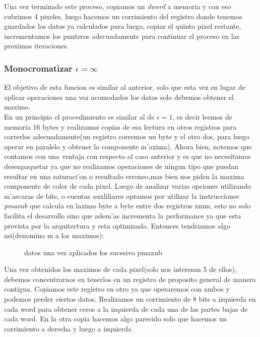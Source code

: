Una vez terminado este proceso, copiamos un \textit{dword} a memoria y con eso cubrimos 4 pixeles,
luego hacemos un corrimiento del registro donde tenemos guardados los datos ya calculados para luego,
copiar el quinto pixel restante, incrementamos los punteros adecuadamente para continuar el 
proceso en las proximas iteraciones.\\


\subsubsection{Monocromatizar $\epsilon = \infty $ }
El objetivo de esta funcion es similar al anterior, solo que esta vez en lugar de aplicar operaciones
una vez acomodados los datos solo debemos obtener el maximo.\\
En un principio el procedimiento es similar al de  $\epsilon= 1$, es decir leemos de memoria 16 bytes
y realizamos copias de esa lectura en otros registros para correrlos adecuadamente(un registro corremos un byte 
 y el otro dos, para luego operar en paralelo y obtener la componente m'axima).  Ahora bien, 
notemos que contamos con una ventaja con respecto al caso anterior y es que no necesitamos desenpaquetar
ya que no realizamos operaciones de ningun tipo que puedan resultar en una saturaci'on o 
resultado erroneo,mas bien nos piden la maxima componente de color de cada pixel. Luego de analizar 
varias opciones utilizando m'ascaras de bits, o cuentas auxliliares optamos por utilizar la instrucciones
\textit{pmaxub} que calcula en laximo byte a byte entre dos registros xmm, esto no solo facilita 
el desarrollo sino que adem'as incrementa la performance ya que esta provista por la arquitectura y 
esta optimizada. Entonces tendriamos algo asi(denomino m a los maximos):\\
\begin{figure}[hb]
\caption{datos una vez aplicados los sucesivo pmaxub}
\label{est:m-uno}
\end{figure}
Una vez obtenidos los maximos de cada pixel(solo nos interesan 5 de ellos), debemos concentrarnos en
tenerlos en un registro de proposito general de manera contigua. 
Copiamos este registro en otro ya que operaremos con ambos y podemos perder ciertos datos. Realizamos un 
corrimiento de 8 bits a izquierda en cada word para obtener ceros a la izquierda de cada una de las partes bajas de
cada word. En la otra copia hacemos algo parecido solo que hacemos un corrimiento a derecha y luego a izquierda
